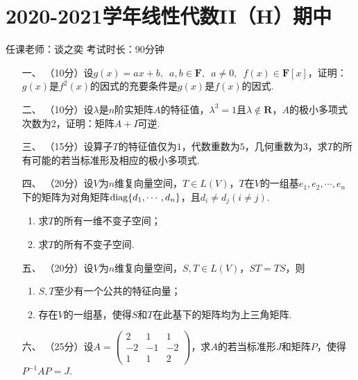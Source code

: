 \section*{2020-2021学年线性代数II（H）期中}


\begin{center}
    任课老师：谈之奕\hspace{4em} 考试时长：90分钟
\end{center}

\begin{enumerate}
	\item[一、]（10分）设$g(x)=ax+b,\enspace a,b\in\mathbf{F},\enspace a\neq 0,\enspace
    f(x)\in \mathbf{F}[x]$，证明：$g(x)$是$f^2(x)$的因式的充要条件是$g(x)$是$f(x)$的因式.
	\item[二、]（10分）设$\lambda$是$n$阶实矩阵$A$的特征值，$\lambda^3=1$且$\lambda\notin\mathbf{R}$，$A$的极小多项式次数为2，证明：矩阵$A+I$可逆.
	\item[三、]（15分）设算子$T$的特征值仅为$1$，代数重数为$5$，几何重数为$3$，求$T$的所有可能的若当标准形及相应的极小多项式.
	\item[四、]（20分）设$V$为$n$维复向量空间，$T\in L(V)$，$T$在$V$的一组基$e_1,e_2,\cdots,e_n$
	下的矩阵为对角矩阵$\textup{diag}\{d_1,\cdots,d_n\}$，且$d_i\neq d_j(i\neq j)$.
    \begin{enumerate}[label=(\arabic*)]
        \item 求$T$的所有一维不变子空间；
        \item 求$T$的所有不变子空间.
    \end{enumerate}
	\item[五、]（20分）设$V$为$n$维复向量空间，$S,T\in L(V)$，$ST=TS$，则
    \begin{enumerate}[label=(\arabic*)]
        \item $S,T$至少有一个公共的特征向量；
        \item 存在$V$的一组基，使得$S$和$T$在此基下的矩阵均为上三角矩阵.
    \end{enumerate}
	\item[六、]（25分）设$A=\begin{pmatrix}
		2 & 1 & 1 \\ -2 & -1 & -2 \\ 1 & 1 & 2
	\end{pmatrix}$，求$A$的若当标准形$J$和矩阵$P$，使得$P^{-1}AP=J$.
\end{enumerate}

\clearpage
